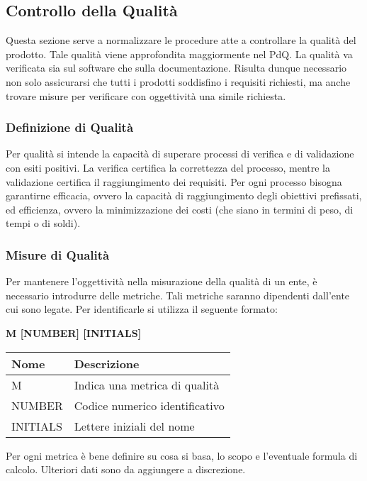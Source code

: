 \subsection{Controllo della Qualità}
Questa sezione serve a normalizzare le procedure atte a controllare la qualità del prodotto.
Tale qualità viene approfondita maggiormente nel PdQ. \newline
La qualità va verificata sia sul software che sulla documentazione. \newline
Risulta dunque necessario non solo assicurarsi che tutti i prodotti soddisfino i requisiti richiesti, 
ma anche trovare misure per verificare con oggettività una simile richiesta.
\subsubsection{Definizione di Qualità}
Per qualità si intende la capacità di superare processi di verifica e di validazione con esiti positivi. \newline 
La verifica certifica la correttezza del processo, mentre la validazione certifica il raggiungimento dei requisiti. \newline
Per ogni processo bisogna garantirne efficacia, ovvero la capacità di raggiungimento degli obiettivi 
prefissati, ed efficienza, ovvero la minimizzazione dei costi (che siano in termini di peso, di tempi o di soldi).
\subsubsection{Misure di Qualità}
Per mantenere l'oggettività nella misurazione della qualità di un ente, è necessario introdurre delle metriche.
Tali metriche saranno dipendenti dall'ente cui sono legate. \newline
Per identificarle si utilizza il seguente formato:
\begin{center}
	\textbf{M [NUMBER] [INITIALS]}
\end{center}
\renewcommand{\arraystretch}{1.8} %
    \begin{tabular}{ |m{7em}|m{30em}| }
        \hline
        \textbf{Nome} & \textbf{Descrizione} \\
        \hline
            M & Indica una metrica di qualità \\
        \hline
            NUMBER & Codice numerico identificativo \\
        \hline
            INITIALS & Lettere iniziali del nome \\
        \hline
    \end{tabular} \newline \newline
Per ogni metrica è bene definire su cosa si basa, lo scopo e l'eventuale formula di calcolo. Ulteriori dati sono da aggiungere
a discrezione.
